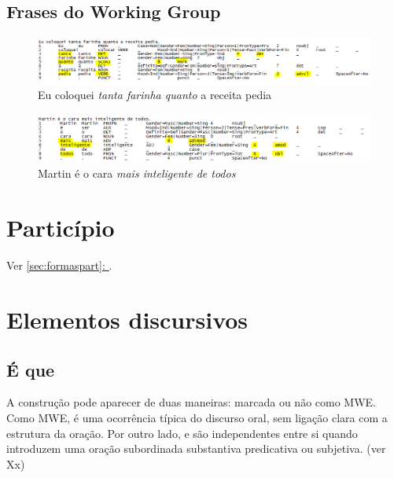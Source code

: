 \documentclass[output=paper,colorlinks,citecolor=brown]{langscibook}
\newcommand*{\fullref}[1]{\hyperref[{#1}]{\autoref*{#1}: \nameref*{#1}}} %
\begin{document}
	\subsection{Frases do Working Group}
	
	\begin{figure}
	    \centering
	    \includegraphics[width=\textwidth,height=\textheight,keepaspectratio]{imagesDrive/image23.png}
	    \caption{Eu coloquei \emph{tanta farinha quanto} a receita pedia}
	    \label{fig:comparative1}
	    \end{figure}{}
	
	\begin{figure}
	    \centering
	    \includegraphics[width=\textwidth,height=\textheight,keepaspectratio]{imagesDrive/image32.png}
	    \caption{Martin é o cara \emph{mais inteligente de todos}}
	    \label{fig:comparative2}
	\end{figure}{}


\section{Particípio}

	Ver \fullref{sec:formaspart}.
	
\section{Elementos discursivos}


	\subsection{É que}


	A construção  pode aparecer de duas maneiras: marcada ou não como MWE. Como MWE,  é uma ocorrência típica do discurso oral, sem ligação clara com a estrutura da oração. Por outro lado,  e  são independentes entre si quando introduzem uma oração subordinada substantiva predicativa ou subjetiva. (ver Xx)
\end{document}
